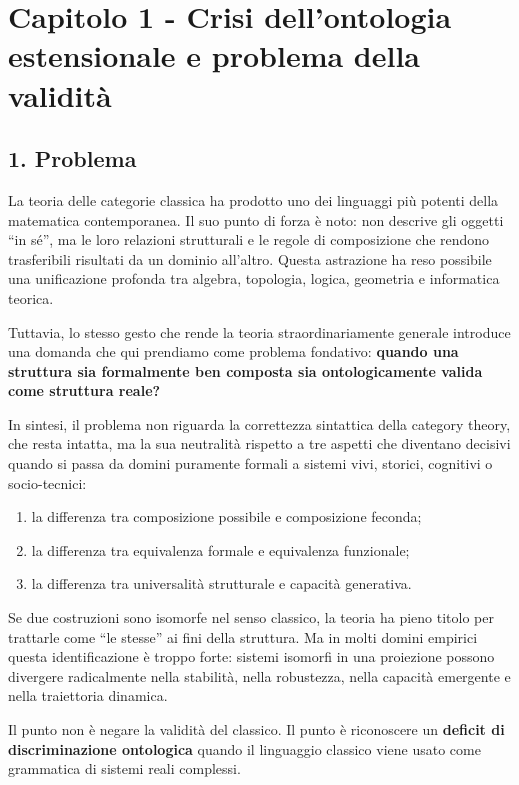 \chapter{Capitolo 1 - Crisi dell'ontologia estensionale e problema della validità}

\section{1. Problema}

La teoria delle categorie classica ha prodotto uno dei linguaggi più potenti della matematica contemporanea. Il suo punto di forza è noto: non descrive gli oggetti ``in sé'', ma le loro relazioni strutturali e le regole di composizione che rendono trasferibili risultati da un dominio all'altro. Questa astrazione ha reso possibile una unificazione profonda tra algebra, topologia, logica, geometria e informatica teorica.

Tuttavia, lo stesso gesto che rende la teoria straordinariamente generale introduce una domanda che qui prendiamo come problema fondativo: \textbf{quando una struttura sia formalmente ben composta sia ontologicamente valida come struttura reale?}

In sintesi, il problema non riguarda la correttezza sintattica della category theory, che resta intatta, ma la sua neutralità rispetto a tre aspetti che diventano decisivi quando si passa da domini puramente formali a sistemi vivi, storici, cognitivi o socio-tecnici:

\begin{enumerate}
\def\labelenumi{\arabic{enumi}.}
\tightlist
\item
  la differenza tra composizione possibile e composizione feconda;
\item
  la differenza tra equivalenza formale e equivalenza funzionale;
\item
  la differenza tra universalità strutturale e capacità generativa.
\end{enumerate}

Se due costruzioni sono isomorfe nel senso classico, la teoria ha pieno titolo per trattarle come ``le stesse'' ai fini della struttura. Ma in molti domini empirici questa identificazione è troppo forte: sistemi isomorfi in una proiezione possono divergere radicalmente nella stabilità, nella robustezza, nella capacità emergente e nella traiettoria dinamica.

Il punto non è negare la validità del classico. Il punto è riconoscere un \textbf{deficit di discriminazione ontologica} quando il linguaggio classico viene usato come grammatica di sistemi reali complessi.

